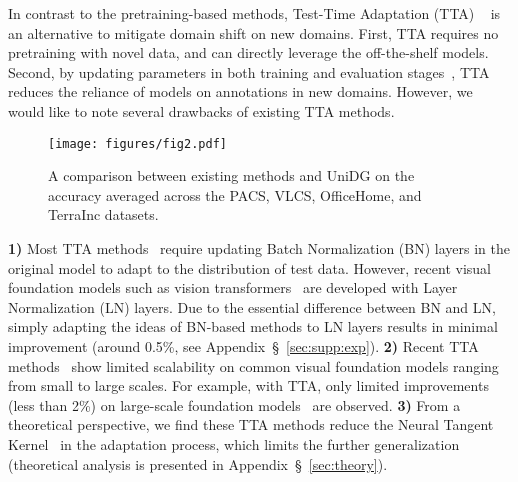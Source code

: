 \documentclass{article} \usepackage{iclr2024_conference,times}
\begin{document}
	In contrast to the pretraining-based methods, Test-Time Adaptation (TTA) ~\citep{sun2020test,wang2020tent,wang2022continual,wang2022generalizing} is an alternative to mitigate domain shift on new domains. First, TTA requires no pretraining with novel data, and can directly leverage the off-the-shelf models. Second, by updating parameters in both training and evaluation stages~\citep{sun2020test}, TTA reduces the reliance of models on annotations in new domains. However, we would like to note several drawbacks of existing TTA methods.
    \begin{wrapfigure}{l}[0cm]{0pt}
    \begin{minipage}{0.43\linewidth}
    \vspace{-5.5mm}
    \texttt{[image: figures/fig2.pdf]}
    \vspace{-6mm}
    \caption{A comparison between existing methods and UniDG on the accuracy averaged across the PACS, VLCS, OfficeHome, and TerraInc datasets.}
    \label{fig:cmp}
    \vspace{-4mm}
    \end{minipage}
    \end{wrapfigure}
     \textbf{1)} Most TTA methods~\citep{wang2020tent,iwasawa2021test,jang2022test} require updating Batch Normalization (BN) \citep{ioffe2015batch} layers in the original model to adapt to the distribution of test data. However, recent visual foundation models such as vision transformers~\citep{dosovitskiy2020image} are developed with Layer Normalization (LN) layers. Due to the essential difference between BN and LN, simply adapting the ideas of BN-based methods to LN layers results in minimal improvement (around 0.5\%, see Appendix~\S~\ref{sec:supp:exp}). \textbf{2)} Recent TTA methods~\citep{zhang2023adanpc,park2023test,zhang2023domainadaptor, chen2023improved} show limited scalability on common visual foundation models ranging from small to large scales.
     For example, with TTA, only limited improvements (less than 2\%) on large-scale foundation models~\citep{radford2021learning,liu2022convnet} are observed. \textbf{3)} From a theoretical perspective, we find these TTA methods reduce the Neural Tangent Kernel~\citep{jacot2018neural} in the adaptation process, which limits the further generalization (theoretical analysis is presented in Appendix~\S~\ref{sec:theory}).
\end{document}
